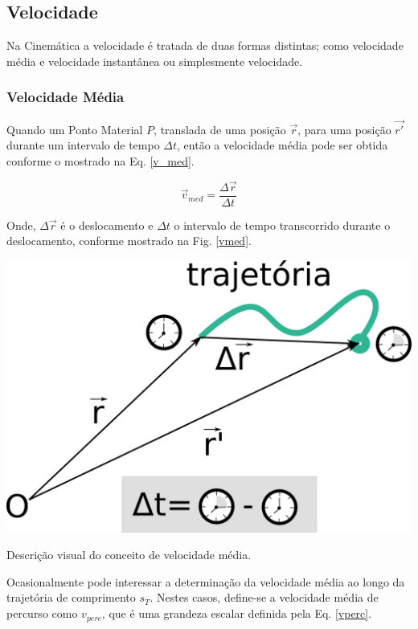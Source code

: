 \documentclass[a4paper, 11pt]{report}
\begin{document}
\subsection{Velocidade}

Na Cinemática a velocidade é tratada de duas formas distintas;
como velocidade média e velocidade instantânea ou simplesmente velocidade. 

\subsubsection*{Velocidade Média}
Quando um Ponto Material $P$, translada de uma posição $\vec{r}$, para uma 
posição $\vec{r'}$ durante um intervalo de tempo $\Delta t$, então a velocidade
média pode ser obtida conforme o mostrado na Eq. \ref{v_med}.

\begin{equation}
    \vec{v}_{med} = \frac{\Delta \vec{r}}{\Delta t}
    \label{v_med}
\end{equation}

Onde, $\Delta \vec{r}$ é o deslocamento e $\Delta t$ o intervalo de tempo 
transcorrido durante o deslocamento, conforme mostrado na Fig. \ref{vmed}.

\begin{staticfigure}
    \centering
    
    \includegraphics[scale=0.5]{img/vmed.png}

    \caption{\footnotesize Descrição visual do conceito de velocidade média.}
    \label{vmed}

\end{staticfigure}

Ocasionalmente pode interessar a determinação da velocidade média ao longo da 
trajetória de comprimento $s_T$. Nestes casos, define-se a velocidade média de 
percurso como $v_{perc}$, que é uma grandeza escalar definida pela Eq. 
\ref{vperc}.
\end{document}
